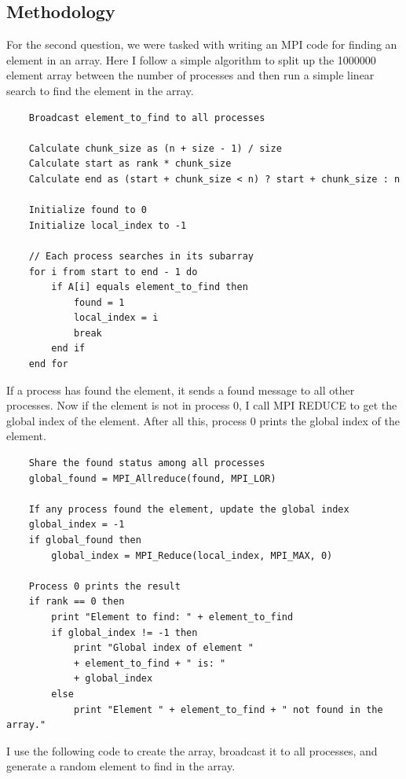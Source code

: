 \documentclass[12pt]{article}
\begin{document}
\subsection*{Methodology}
For the second question, we were tasked with writing an MPI code for finding an element in an array. Here I follow a simple algorithm to split up the 1000000 element array between the number of processes and then run a simple linear search to find the element in the array.
\begin{verbatim}
    Broadcast element_to_find to all processes

    Calculate chunk_size as (n + size - 1) / size
    Calculate start as rank * chunk_size
    Calculate end as (start + chunk_size < n) ? start + chunk_size : n
    
    Initialize found to 0
    Initialize local_index to -1
    
    // Each process searches in its subarray
    for i from start to end - 1 do
        if A[i] equals element_to_find then
            found = 1
            local_index = i
            break
        end if
    end for
\end{verbatim}
If a process has found the element, it sends a found message to all other processes. Now if the element is not in process 0, I call MPI REDUCE to get the global index of the element. After all this, process 0 prints the global index of the element.
\begin{verbatim}
    Share the found status among all processes
    global_found = MPI_Allreduce(found, MPI_LOR)
    
    If any process found the element, update the global index
    global_index = -1
    if global_found then
        global_index = MPI_Reduce(local_index, MPI_MAX, 0)
    
    Process 0 prints the result
    if rank == 0 then
        print "Element to find: " + element_to_find
        if global_index != -1 then
            print "Global index of element " 
            + element_to_find + " is: " 
            + global_index
        else
            print "Element " + element_to_find + " not found in the array."
\end{verbatim}
I use the following code to create the array, broadcast it to all processes, and generate a random element to find in the array.
\end{document}
